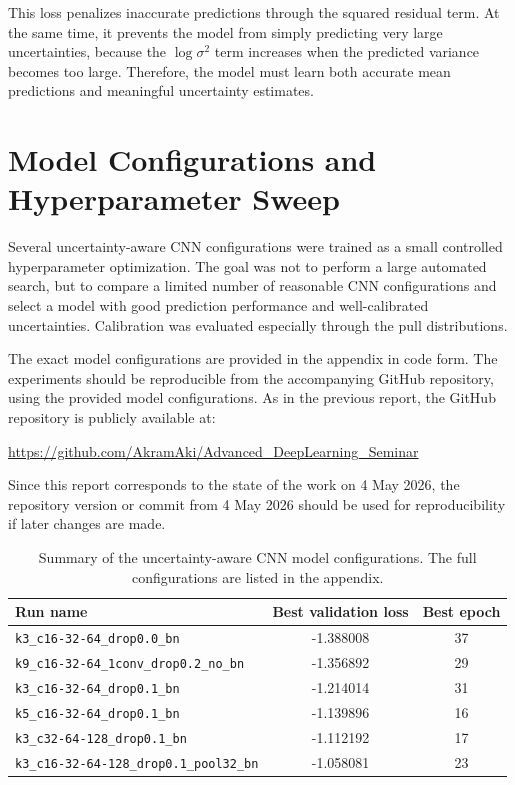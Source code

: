 This loss penalizes inaccurate predictions through the squared residual term. At the same time, it prevents the model from simply predicting very 
large uncertainties, because the $\log \sigma^2$ term increases when the predicted variance becomes too large. 
Therefore, the model must learn both accurate mean predictions and meaningful uncertainty estimates.

\section{Model Configurations and Hyperparameter Sweep}

Several uncertainty-aware CNN configurations were trained as a small controlled hyperparameter optimization. The goal was not to perform a large automated 
search, but to compare a limited number of reasonable CNN configurations and select a model with good prediction performance and 
well-calibrated uncertainties. Calibration was evaluated especially through the pull distributions.

The exact model configurations are provided in the appendix in code form. The experiments should be reproducible from the accompanying GitHub repository, 
using the provided model configurations. As in the previous report, the GitHub repository is publicly available at:
\begin{center}
    \url{https://github.com/AkramAki/Advanced_DeepLearning_Seminar}
\end{center}

Since this report corresponds to the state of the work on 4 May 2026, the repository version or commit from 4 May 2026 should be used for reproducibility 
if later changes are made.

\begin{table}[h]
    \centering
    \begin{tabular}{lcc}
        \toprule
        Run name & Best validation loss & Best epoch \\
        \midrule
        \texttt{k3\_c16-32-64\_drop0.0\_bn} & -1.388008 & 37 \\
        \texttt{k9\_c16-32-64\_1conv\_drop0.2\_no\_bn} & -1.356892 & 29 \\
        \texttt{k3\_c16-32-64\_drop0.1\_bn} & -1.214014 & 31 \\
        \texttt{k5\_c16-32-64\_drop0.1\_bn} & -1.139896 & 16 \\
        \texttt{k3\_c32-64-128\_drop0.1\_bn} & -1.112192 & 17 \\
        \texttt{k3\_c16-32-64-128\_drop0.1\_pool32\_bn} & -1.058081 & 23 \\
        \bottomrule
    \end{tabular}
    \caption{Summary of the uncertainty-aware CNN model configurations. The full configurations are listed in the appendix.}
    \label{tab:model_sweep}
\end{table}


